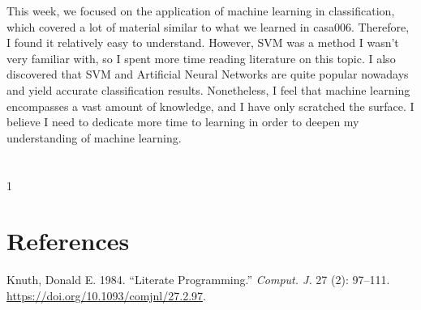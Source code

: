 \documentclass[
  letterpaper,
  DIV=11,
  numbers=noendperiod]{scrreprt}
\newlength{\cslhangindent}
\newlength{\cslentryspacingunit} %
\newenvironment{CSLReferences}[2] %
 {%
  \setlength{\parindent}{0pt}
  \ifodd #1
  \let\oldpar\par
  \def\par{\hangindent=\cslhangindent\oldpar}
  \fi
  \setlength{\parskip}{#2\cslentryspacingunit}
 }%
 {}
\begin{document}
This week, we focused on the application of machine learning in
classification, which covered a lot of material similar to what we
learned in casa006. Therefore, I found it relatively easy to understand.
However, SVM was a method I wasn't very familiar with, so I spent more
time reading literature on this topic. I also discovered that SVM and
Artificial Neural Networks are quite popular nowadays and yield accurate
classification results. Nonetheless, I feel that machine learning
encompasses a vast amount of knowledge, and I have only scratched the
surface. I believe I need to dedicate more time to learning in order to
deepen my understanding of machine learning.


\hypertarget{section}{%
\chapter{}\label{section}}

1


\hypertarget{references}{%
\chapter*{References}\label{references}}


\hypertarget{refs}{}
\begin{CSLReferences}{1}{0}
\leavevmode{}%
Knuth, Donald E. 1984. {``Literate Programming.''} \emph{Comput. J.} 27
(2): 97--111. \url{https://doi.org/10.1093/comjnl/27.2.97}.

\end{CSLReferences}
\end{document}
